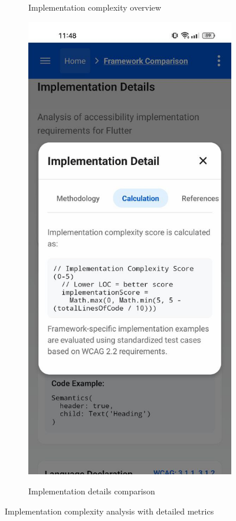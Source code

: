 \begin{figure}[ht]
\begin{subfigure}[b]{0.48\textwidth}
        \caption{Implementation complexity overview}
        \label{fig:implementation-complexity-card}
    \end{subfigure}
    \hfill
    \begin{subfigure}[b]{0.48\textwidth}
        \centering
        \includegraphics[width=\linewidth, alt={Implementation Details modal showing comparison metrics}]{img/implementation-calculation.jpg}
        \caption{Implementation details comparison}
        \label{fig:implementation-details-modal}
    \end{subfigure}
    \caption{Implementation complexity analysis with detailed metrics}
    \label{fig:implementation_complexity}
\end{figure}

